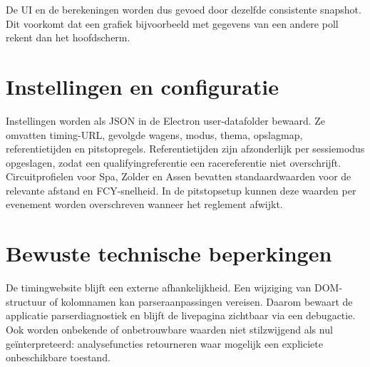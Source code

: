 De UI en de berekeningen worden dus gevoed door dezelfde consistente snapshot. Dit voorkomt dat een grafiek bijvoorbeeld met gegevens van een andere poll rekent dan het hoofdscherm.

\section{Instellingen en configuratie}
Instellingen worden als JSON in de Electron user-datafolder bewaard. Ze omvatten timing-URL, gevolgde wagens, modus, thema, opslagmap, referentietijden en pitstopregels. Referentietijden zijn afzonderlijk per sessiemodus opgeslagen, zodat een qualifyingreferentie een racereferentie niet overschrijft. Circuitprofielen voor Spa, Zolder en Assen bevatten standaardwaarden voor de relevante afstand en FCY-snelheid. In de pitstopsetup kunnen deze waarden per evenement worden overschreven wanneer het reglement afwijkt.

\section{Bewuste technische beperkingen}
De timingwebsite blijft een externe afhankelijkheid. Een wijziging van DOM-structuur of kolomnamen kan parseraanpassingen vereisen. Daarom bewaart de applicatie parserdiagnostiek en blijft de livepagina zichtbaar via een debugactie. Ook worden onbekende of onbetrouwbare waarden niet stilzwijgend als nul geïnterpreteerd: analysefuncties retourneren waar mogelijk een expliciete onbeschikbare toestand.

